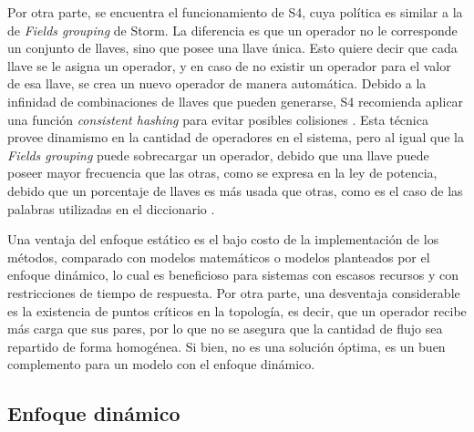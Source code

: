 
Por otra parte, se encuentra el funcionamiento de S4, cuya política es similar a la de \textit{Fields grouping} de Storm. La diferencia es que un operador no le corresponde un conjunto de llaves, sino que posee una llave única. Esto quiere decir que cada llave se le asigna un operador, y en caso de no existir un operador para el valor de esa llave, se crea un nuevo operador de manera automática. Debido a la infinidad de combinaciones de llaves que pueden generarse, S4 recomienda aplicar una función \textit{consistent hashing} para evitar posibles colisiones \citep{X11cp}. Esta técnica provee dinamismo en la cantidad de operadores en el sistema, pero al igual que la \textit{Fields grouping} puede sobrecargar un operador, debido que una llave puede poseer mayor frecuencia que las otras, como se expresa en la ley de potencia, debido que un porcentaje de llaves es más usada que otras, como es el caso de las palabras utilizadas en el diccionario \citep{rushton2010handbook}.

Una ventaja del enfoque estático es el bajo costo de la implementación de los métodos, comparado con modelos matemáticos o modelos planteados por el enfoque dinámico, lo cual es beneficioso para sistemas con escasos recursos y con restricciones de tiempo de respuesta. Por otra parte, una desventaja considerable es la existencia de puntos críticos en la topología, es decir, que un operador recibe más carga que sus pares, por lo que no se asegura que la cantidad de flujo sea repartido de forma homogénea. Si bien, no es una solución óptima, es un buen complemento para un modelo con el enfoque dinámico.

\subsection{Enfoque dinámico}
\label{subsec:enfoqueDinamicoBC}


